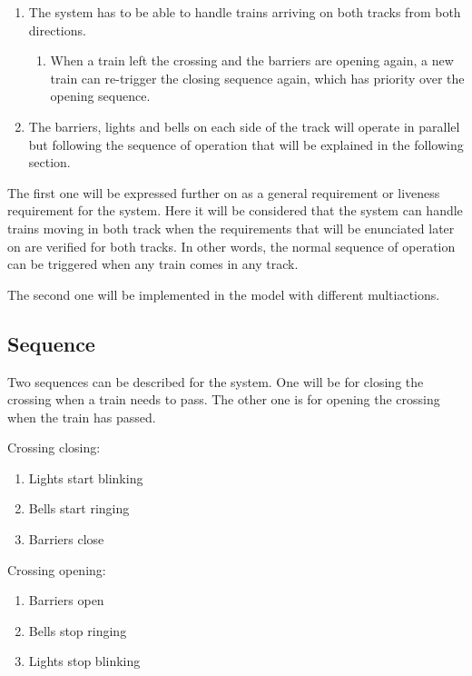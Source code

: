 \documentclass[final]{report}
\begin{document}
\begin{enumerate}
\item The system has to be able to handle trains arriving on both tracks from both directions.
	\begin{enumerate}
	\item When a train left the crossing and the barriers are opening again, a new train can re-trigger the closing sequence again, which has priority over the opening sequence.	
	\end{enumerate}	

\item The barriers, lights and bells on each side of the track will operate in parallel but following the sequence of operation that will be explained in the following section.
\end{enumerate}

The first one will be expressed further on as a general requirement or liveness requirement for the system.
Here it will be considered that the system can handle trains moving in both track when the requirements that will be enunciated  later on are verified for both tracks.
In other words, the normal sequence of operation can be triggered when any train comes in any track.

The second one will be implemented in the model with different multiactions.	



\subsection{Sequence}
Two sequences can be described for the system.
One will be for closing the crossing when a train needs to pass.
The other one is for opening the crossing when the train has passed.

Crossing closing:
\begin{enumerate}
\item Lights start blinking
\item Bells start ringing
\item Barriers close
\end{enumerate}

Crossing opening:
\begin{enumerate}
\item Barriers open
\item Bells stop ringing
\item Lights stop blinking
\end{enumerate}
\end{document}
